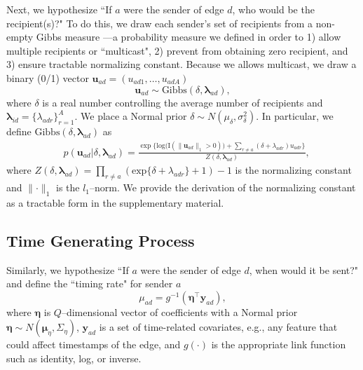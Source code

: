 \documentclass[12pt]{article}
\begin{document}
Next, we hypothesize ``If $a$ were the sender of edge $d$, who would be the recipient(s)?" To do this, we draw each sender's set of recipients from a non-empty Gibbs measure \cite{fellows2017removing}---a probability measure we defined in order to 1) allow multiple recipients or ``multicast", 2) prevent from obtaining zero recipient, and 3) ensure tractable normalizing constant. Because we allows multicast, we draw a binary (0/1) vector $\boldsymbol{u}_{ad}= (u_{ad1},
\ldots, u_{adA})$
\begin{equation} \boldsymbol{u}_{ad}  \sim
\mbox{Gibbs}(\delta, \boldsymbol{\lambda}_{ad}),
\end{equation}
where $\delta$ is a real number controlling the average number of recipients and $\boldsymbol{\lambda}_{id}= \{\lambda_{adr}\}_{r=1}^A$. We place a Normal prior $\delta \sim N(\mu_\delta,\sigma^2_\delta)$. In particular, we define $\mbox{Gibbs}(\delta, \boldsymbol{\lambda}_{ad})$ as
\begin{equation}
\begin{aligned}
&p(\boldsymbol{u}_{ad}|\delta, \boldsymbol{\lambda}_{ad}) = \frac{\exp\Big\{\mbox{log}\big(\text{I}( \lVert \boldsymbol{u}_{ad}\rVert_1 > 0 )\big) + \sum_{r\neq a} (\delta+\lambda_{adr})u_{adr}\Big\}}{Z(\delta,\boldsymbol{\lambda}_{ad})} ,
\end{aligned}
\label{eqn:Gibbs}
\end{equation}
where $Z(\delta,\boldsymbol{\lambda}_{ad})= \prod_{r \neq a} (\mbox{exp}\{\delta+\lambda_{adr}\} + 1)-1$ is the normalizing constant and $\lVert \cdot \rVert_1$ is the $l_1$--norm. We provide the derivation of the normalizing constant as a tractable form in the supplementary material. 


\subsection{Time Generating Process}\label{subsec:Time}
Similarly, we hypothesize ``If $a$ were the sender of edge $d$, when would it be sent?" and define the ``timing rate" for sender $a$
\begin{equation}
\mu_{ad} = g^{-1}(\boldsymbol{\eta}^\top \boldsymbol{y}_{ad}),
\end{equation}
where $\boldsymbol{\eta}$ is $Q$--dimensional vector of coefficients with a Normal prior $\boldsymbol{\eta} \sim N(\boldsymbol{\mu}_\eta,\Sigma_\eta)$, $\boldsymbol{y}_{ad}$ is a set of time-related covariates, e.g., any feature that could affect timestamps of the edge, and $g(\cdot)$ is the appropriate link function such as identity, log, or inverse. 
\end{document}

